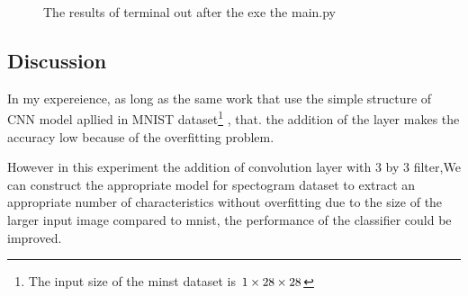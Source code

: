 \begin{figure}[h!]
{}
\caption{The results of terminal out after the exe the main.py}
\end{figure}

\subsection{Discussion}
In my expereience, as long as the same work that use the simple structure of CNN model apllied in MNIST dataset\footnote{The input size of the minst dataset is $\small 1 \times 28 \times 28$} , that. the addition of the layer makes the accuracy low because of the overfitting problem.

However in this experiment the addition of convolution layer with 3 by 3 filter,We can construct the appropriate model for spectogram dataset to extract an appropriate number of characteristics without overfitting due to the size of the larger input image compared to mnist, the performance of the classifier could be improved.